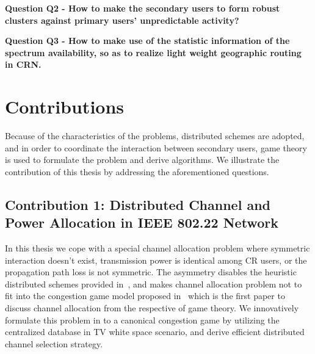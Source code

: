 \textbf{Question Q2 - How to make the secondary users to form robust clusters against primary users' unpredictable activity?}

\textbf{Question Q3 - How to make use of the statistic information of the spectrum availability, so as to realize light weight geographic routing in CRN.}




\section{Contributions}
Because of the characteristics of the problems, distributed schemes are adopted, and in order to coordinate the interaction between secondary users, game theory is used to formulate the problem and derive algorithms.
We illustrate the contribution of this thesis by addressing the aforementioned questions.


\subsection*{Contribution 1: Distributed Channel and Power Allocation in IEEE 802.22 Network}



In this thesis we cope with a special channel allocation problem where symmetric interaction doesn't exist, \ie transmission power is identical among CR users, or the propagation path loss is not symmetric. 
The asymmetry disables the heuristic distributed schemes provided in~\cite{Ko_DistributedCA}, and makes channel allocation problem not to fit into the congestion game model proposed in~\cite{allerton08_liu} which is the first paper to discuss channel allocation from the respective of game theory.
We innovatively formulate this problem in to a canonical congestion game by utilizing the centralized database in TV white space scenario, and derive efficient distributed channel selection strategy.



